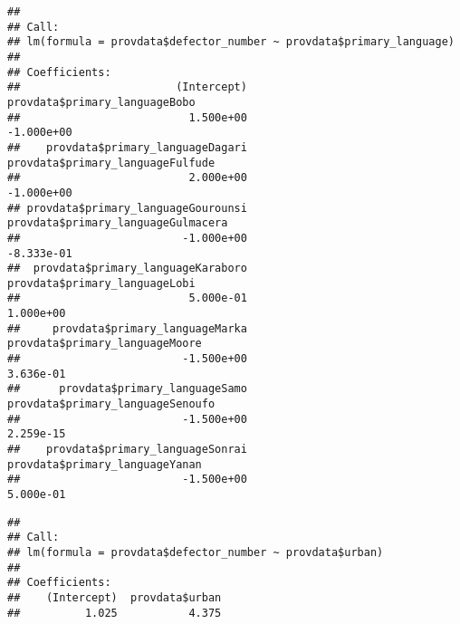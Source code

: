 \documentclass[]{article}
\newenvironment{Shaded}{\begin{snugshade}}{\end{snugshade}}
\newcommand{\KeywordTok}[1]{\textcolor[rgb]{0.13,0.29,0.53}{\textbf{#1}}}
\newcommand{\NormalTok}[1]{#1}
\newcommand{\OperatorTok}[1]{\textcolor[rgb]{0.81,0.36,0.00}{\textbf{#1}}}
\newcommand{\StringTok}[1]{\textcolor[rgb]{0.31,0.60,0.02}{#1}}
\begin{document}
\begin{Shaded}
\end{Shaded}

\begin{verbatim}
## 
## Call:
## lm(formula = provdata$defector_number ~ provdata$primary_language)
## 
## Coefficients:
##                        (Intercept)       provdata$primary_languageBobo  
##                          1.500e+00                          -1.000e+00  
##    provdata$primary_languageDagari    provdata$primary_languageFulfude  
##                          2.000e+00                          -1.000e+00  
## provdata$primary_languageGourounsi  provdata$primary_languageGulmacera  
##                         -1.000e+00                          -8.333e-01  
##  provdata$primary_languageKaraboro       provdata$primary_languageLobi  
##                          5.000e-01                           1.000e+00  
##     provdata$primary_languageMarka      provdata$primary_languageMoore  
##                         -1.500e+00                           3.636e-01  
##      provdata$primary_languageSamo    provdata$primary_languageSenoufo  
##                         -1.500e+00                           2.259e-15  
##    provdata$primary_languageSonrai      provdata$primary_languageYanan  
##                         -1.500e+00                           5.000e-01
\end{verbatim}

\begin{Shaded}
\end{Shaded}

\begin{verbatim}
## 
## Call:
## lm(formula = provdata$defector_number ~ provdata$urban)
## 
## Coefficients:
##    (Intercept)  provdata$urban  
##          1.025           4.375
\end{verbatim}

\begin{Shaded}
\end{Shaded}
\end{document}
